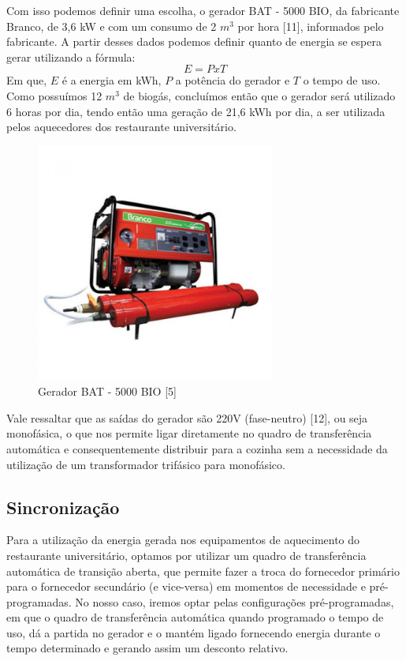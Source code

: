 Com isso podemos definir uma escolha, o gerador BAT - 5000 BIO, da fabricante Branco, de 3,6 kW e com um consumo de 2 $m^{3}$ por hora [11], informados pelo fabricante. A partir desses dados podemos definir quanto de energia se espera gerar utilizando a fórmula:
\begin{equation}
E = P x T
\end{equation}
Em que, $E$ é a energia em kWh, $P$ a potência do gerador e $T$ o tempo de uso. Como possuímos 12 $m^{3}$ de biogás, concluímos então que o gerador será utilizado 6 horas por dia, tendo então uma geração de 21,6 kWh por dia, a ser utilizada pelos aquecedores dos restaurante universitário.
\begin{figure}[!h]
	\centering
	\includegraphics[width=0.7\textwidth]{figuras/geradorBAT.png}
	\caption{Gerador BAT - 5000 BIO [5]}
	\label{fig:geradorbat}
\end{figure}

Vale ressaltar que as saídas do gerador são 220V (fase-neutro) [12], ou seja monofásica, o que nos permite ligar diretamente no quadro de transferência automática e consequentemente distribuir para a cozinha sem a necessidade da utilização de um transformador trifásico para monofásico.

\subsection{Sincronização}
Para a utilização da energia gerada nos equipamentos de aquecimento do restaurante universitário, optamos por utilizar um quadro de transferência automática de transição aberta, que permite fazer a troca do fornecedor primário para o fornecedor secundário (e vice-versa) em momentos de necessidade e pré-programadas. No nosso caso, iremos optar pelas configurações pré-programadas, em que o quadro de transferência automática quando programado o tempo de uso, dá a partida no gerador e o mantém ligado fornecendo energia durante o tempo determinado e gerando assim um desconto relativo. 

